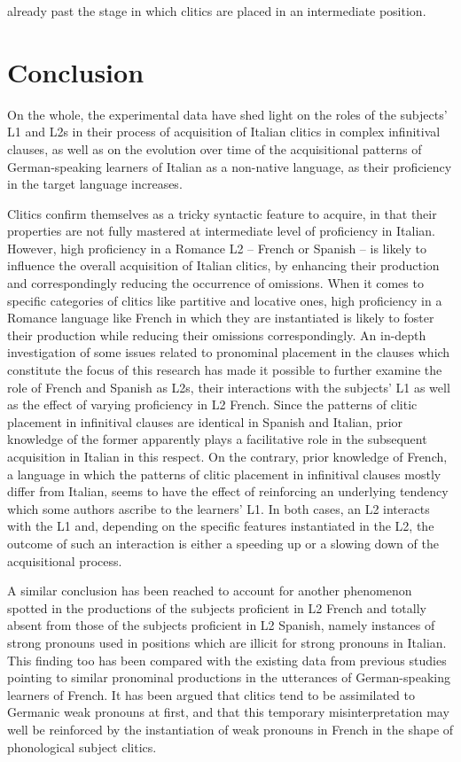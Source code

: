 \documentclass[output=paper,modfonts,nonflat,newtxmath]{langsci/langscibook}
\begin{document}
already past the stage in which clitics are placed in an intermediate position.

\section{Conclusion} %

\label{sec:sciutti:6}

On the whole, the experimental data have shed light on the roles of the subjects’ L1 and L2s in their process of acquisition of Italian clitics in complex infinitival clauses, as well as on the evolution over time of the acquisitional patterns of German-speaking learners of Italian as a non-native language, as their proficiency in the target language increases.

Clitics confirm themselves as a tricky syntactic feature to acquire, in that their properties are not fully mastered at intermediate level of proficiency in Italian. However, high proficiency in a Romance L2 – French or Spanish – is likely to influence the overall acquisition of Italian clitics, by enhancing their production and correspondingly reducing the occurrence of omissions. When it comes to specific categories of clitics like partitive and locative ones, high proficiency in a Romance language like French in which they are instantiated is likely to foster their production while reducing their omissions correspondingly. An in-depth investigation of some issues related to pronominal placement in the clauses which constitute the focus of this research has made it possible to further examine the role of French and Spanish as L2s, their interactions with the subjects’ L1 as well as the effect of varying proficiency in L2 French. Since the patterns of clitic placement in infinitival clauses are identical in Spanish and Italian, prior knowledge of the former apparently plays a facilitative role in the subsequent acquisition in Italian in this respect. On the contrary, prior knowledge of French, a language in which the patterns of clitic placement in infinitival clauses mostly differ from Italian, seems to have the effect of reinforcing an underlying tendency which some authors ascribe to the learners’ L1. In both cases, an L2 interacts with the L1 and, depending on the specific features instantiated in the L2, the outcome of such an interaction is either a speeding up or a slowing down of the acquisitional process.

A similar conclusion has been reached to account for another phenomenon spotted in the productions of the subjects proficient in L2 French and totally absent from those of the subjects proficient in L2 Spanish, namely instances of strong pronouns used in positions which are illicit for strong pronouns in Italian. This finding too has been compared with the existing data from previous studies pointing to similar pronominal productions in the utterances of German-speaking learners of French. It has been argued that clitics tend to be assimilated to Germanic weak pronouns at first, and that this temporary misinterpretation may well be reinforced by the instantiation of weak pronouns in French in the shape of phonological subject clitics.
\end{document}

